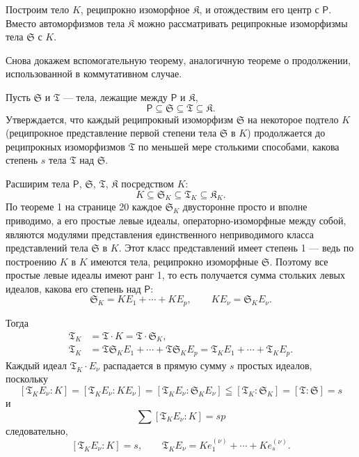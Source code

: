 \documentclass[11pt]{article}
\begin{document}
Построим тело \(K\), реципрокно изоморфное \(\mathfrak K\), и отождествим его центр с \(\mathsf P\). Вместо автоморфизмов тела \(\mathfrak K\) можно рассматривать реципрокные изоморфизмы тела \(\mathfrak S\) с \(K\).

Снова докажем вспомогательную теорему, аналогичную теореме о продолжении, использованной в коммутативном случае.

Пусть \(\mathfrak S\) и \(\mathfrak T\) --- тела, лежащие между \(\mathsf P\) и \(\mathfrak K\),
\[
\mathsf P \subseteq \mathfrak S \subseteq \mathfrak T \subseteq \mathfrak K.
\]
Утверждается, что каждый реципрокный изоморфизм \(\mathfrak S\) на некоторое подтело \(K\) (реципрокное представление первой степени тела \(\mathfrak S\) в \(K\)) продолжается до реципрокных изоморфизмов \(\mathfrak T\) по меньшей мере столькими способами, какова степень \(s\) тела \(\mathfrak T\) над \(\mathfrak S\).

Расширим тела \(\mathsf P\), \(\mathfrak S\), \(\mathfrak T\), \(\mathfrak K\) посредством \(K\):
\[
K\subseteq \mathfrak S_K\subseteq \mathfrak T_K\subseteq \mathfrak K_K.
\]
По теореме 1 на странице 20 каждое \(\mathfrak S_K\) двусторонне просто и вполне приводимо, а его простые левые идеалы, операторно-изоморфные между собой, являются модулями представления единственного неприводимого класса представлений тела \(\mathfrak S\) в \(K\). Этот класс представлений имеет степень 1 --- ведь по построению \(K\) в \(K\) имеются тела, реципрокно изоморфные \(\mathfrak S\). Поэтому все простые левые идеалы имеют ранг 1, то есть получается сумма стольких левых идеалов, какова его степень над \(\mathsf P\):
\[
\mathfrak S_K=K E_1+\cdots+K E_p,\qquad K E_\nu=\mathfrak S_K E_\nu.
\]

Тогда
\[
\begin{aligned}
\mathfrak T_K&=\mathfrak T\cdot K=\mathfrak T\cdot \mathfrak S_K,\\
\mathfrak T_K&=\mathfrak T\mathfrak S_K E_1+\cdots+\mathfrak T\mathfrak S_K E_p
              =\mathfrak T_K E_1+\cdots+\mathfrak T_K E_p.
\end{aligned}
\]
Каждый идеал \(\mathfrak T_K\cdot E_\nu\) распадается в прямую сумму \(s\) простых идеалов, поскольку
\[
[\mathfrak T_K E_\nu:K]=[\mathfrak T_K E_\nu:K E_\nu]=[\mathfrak T_K E_\nu:\mathfrak S_K E_\nu]\leqq[\mathfrak T_K:\mathfrak S_K]=[\mathfrak T:\mathfrak S]=s
\]
и
\[
\sum [\mathfrak T_K E_\nu:K]=sp
\]
следовательно,
\[
[\mathfrak T_K E_\nu:K]=s,
\qquad
\mathfrak T_K E_\nu=K e_1^{(\nu)}+\cdots+K e_s^{(\nu)}.
\]
\end{document}
